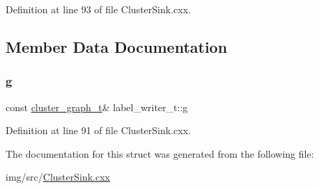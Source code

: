 Definition at line 93 of file Cluster\+Sink.\+cxx.



\subsection{Member Data Documentation}
\mbox{\label{structlabel__writer__t_af3ff7cf87d5cdd0e60c0e1b47bc6717a}} 
\subsubsection{\texorpdfstring{g}{g}}
{\footnotesize\ttfamily const \hyperlink{namespace_wire_cell_a6a9ecba14dfba50cdb081820a8bcacbe}{cluster\+\_\+graph\+\_\+t}\& label\+\_\+writer\+\_\+t\+::g}



Definition at line 91 of file Cluster\+Sink.\+cxx.



The documentation for this struct was generated from the following file\+:\begin{DoxyCompactItemize}
\item 
img/src/\hyperlink{_cluster_sink_8cxx}{Cluster\+Sink.\+cxx}\end{DoxyCompactItemize}
